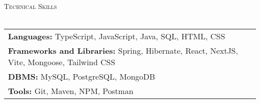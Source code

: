 \documentclass[a4paper]{article}
\newcommand{\lineunder} {
        \vspace*{-8pt} \\
        \hspace*{-18pt} \hrulefill \\
    }
\newcommand{\header} [1] {
        {\vspace*{4mm} \hspace*{-18pt}\vspace*{8pt} \textsc{#1}}
        \vspace*{-6pt} \lineunder
    }
\begin{document}
    \renewcommand{\arraystretch}{1.5}
    \header{Technical Skills}
    \begin{tabular}{ l l }
        \textbf{Languages:} TypeScript, JavaScript, Java, SQL, HTML, CSS                   \\
        \textbf{Frameworks and Libraries:} Spring, Hibernate, React, NextJS, Vite, Mongoose, Tailwind CSS \\
        \textbf{DBMS:} MySQL, PostgreSQL, MongoDB                                              \\
        \textbf{Tools:} Git, Maven, NPM, Postman                                       \\
    \end{tabular}
    \vspace{2mm}

    
\end{document}
